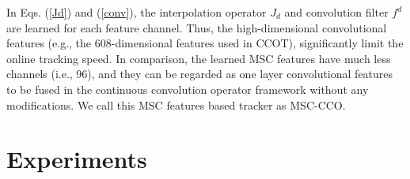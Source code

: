 \documentclass[runningheads]{llncs}
\begin{document}
In Eqs. (\ref{Jd}) and (\ref{conv}), the interpolation operator $J_d$ and convolution filter $f^d$ are learned for each feature channel. Thus, the high-dimensional convolutional features (e.g., the 608-dimensional features used in CCOT), significantly limit the online tracking speed. In comparison, the learned MSC features have much less channels (i.e., 96), and they can be regarded as one layer convolutional features to be fused in the continuous convolution operator framework without any modifications. We call this MSC features based tracker as MSC-CCO. 





\section{Experiments}
\end{document}
